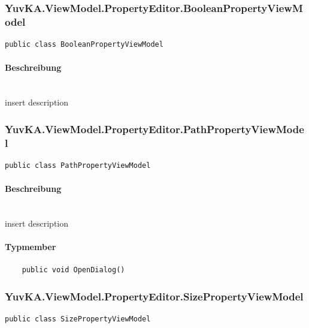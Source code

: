 \subsubsection{YuvKA.ViewModel.PropertyEditor.BooleanPropertyViewModel}

\begin{verbatim}
public class BooleanPropertyViewModel
\end{verbatim}

\paragraph{Beschreibung}~\\
insert description



\subsubsection{YuvKA.ViewModel.PropertyEditor.PathPropertyViewModel}

\begin{verbatim}
public class PathPropertyViewModel
\end{verbatim}

\paragraph{Beschreibung}~\\
insert description

\paragraph{Typmember}
\begin{itemize}

	\begin{verbatim}
	public void OpenDialog()
	\end{verbatim}

\end{itemize}




\subsubsection{YuvKA.ViewModel.PropertyEditor.SizePropertyViewModel}

\begin{verbatim}
public class SizePropertyViewModel
\end{verbatim}

